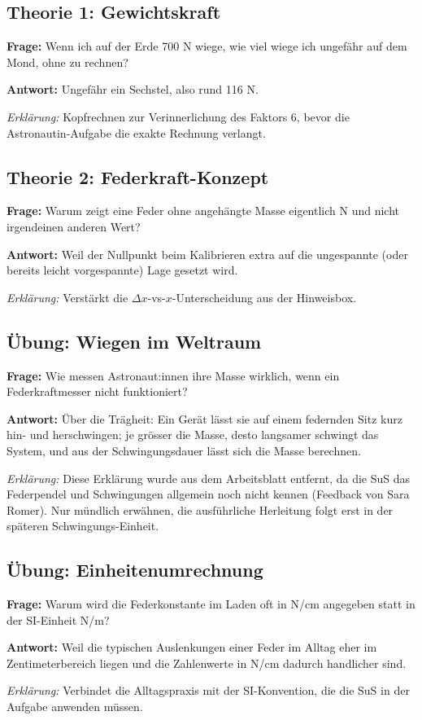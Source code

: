 \documentclass[11pt,a4paper]{article}
\newcommand{\Frage}[1]{\textbf{Frage:} #1\par}
\newcommand{\Antwort}[1]{\textbf{Antwort:} #1\par}
\newcommand{\Erklaerung}[1]{\textit{Erklärung:} #1}
\newcommand{\FrageBlock}[3]{\Frage{#1}\Antwort{#2}\Erklaerung{#3}\vspace{0.6em}}
\begin{document}
\subsection*{Theorie 1: Gewichtskraft}

\FrageBlock{Wenn ich auf der Erde 700 N wiege, wie viel wiege ich ungefähr auf dem Mond, ohne zu rechnen?}
{Ungefähr ein Sechstel, also rund 116 N.}
{Kopfrechnen zur Verinnerlichung des Faktors 6, bevor die Astronautin-Aufgabe die exakte Rechnung verlangt.}

\subsection*{Theorie 2: Federkraft-Konzept}

\FrageBlock{Warum zeigt eine Feder ohne angehängte Masse eigentlich \glqq 0 N\grqq{} und nicht irgendeinen anderen Wert?}
{Weil der Nullpunkt beim Kalibrieren extra auf die ungespannte (oder bereits leicht vorgespannte) Lage gesetzt wird.}
{Verstärkt die $\Delta x$-vs-$x$-Unterscheidung aus der Hinweisbox.}

\subsection*{Übung: Wiegen im Weltraum}

\FrageBlock{Wie messen Astronaut:innen ihre Masse wirklich, wenn ein Federkraftmesser nicht funktioniert?}
{Über die Trägheit: Ein Gerät lässt sie auf einem federnden Sitz kurz hin- und herschwingen; je grösser die Masse, desto langsamer schwingt das System, und aus der Schwingungsdauer lässt sich die Masse berechnen.}
{Diese Erklärung wurde aus dem Arbeitsblatt entfernt, da die SuS das Federpendel und Schwingungen allgemein noch nicht kennen (Feedback von Sara Romer). Nur mündlich erwähnen, die ausführliche Herleitung folgt erst in der späteren Schwingungs-Einheit.}

\subsection*{Übung: Einheitenumrechnung}

\FrageBlock{Warum wird die Federkonstante im Laden oft in N/cm angegeben statt in der SI-Einheit N/m?}
{Weil die typischen Auslenkungen einer Feder im Alltag eher im Zentimeterbereich liegen und die Zahlenwerte in N/cm dadurch handlicher sind.}
{Verbindet die Alltagspraxis mit der SI-Konvention, die die SuS in der Aufgabe anwenden müssen.}
\end{document}
